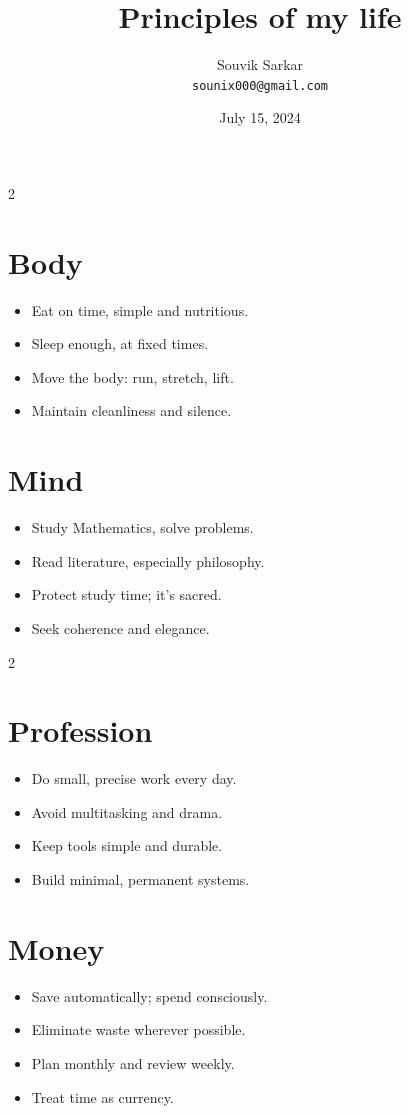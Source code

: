 \documentclass[11pt,a4paper]{article} %
\title{\bfseries Principles of my life}
\author{Souvik Sarkar \\ \texttt{sounix000@gmail.com}}
\date{July 15, 2024}
\begin{document}
\maketitle 

\begin{multicols}{2}
\section{Body}
\begin{itemize}[leftmargin=*]
\item Eat on time, simple and nutritious.
\item Sleep enough, at fixed times.
\item Move the body: run, stretch, lift.
\item Maintain cleanliness and silence.
\end{itemize}

\columnbreak %

\section{Mind}
\begin{itemize}[leftmargin=*]
\item Study Mathematics, solve problems.
\item Read literature, especially philosophy.
\item Protect study time; it's sacred.
\item Seek coherence and elegance.
\end{itemize}
\end{multicols}

\begin{multicols}{2}
\section{Profession}
\begin{itemize}[leftmargin=*]
\item Do small, precise work every day.
\item Avoid multitasking and drama.
\item Keep tools simple and durable.
\item Build minimal, permanent systems.
\end{itemize}

\columnbreak %

\section{Money}
\begin{itemize}[leftmargin=*]
\item Save automatically; spend consciously.
\item Eliminate waste wherever possible.
\item Plan monthly and review weekly.
\item Treat time as currency.
\end{itemize}
\end{multicols}
\end{document}

